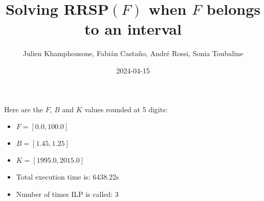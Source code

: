 \documentclass{article}
\begin{document}
     \title{Solving RRSP$(F)$ when $F$ belongs to an interval}
     \author{Julien Khamphousone, Fabi\'an Casta\~no, Andr\'e Rossi, Sonia Toubaline}
     \date{2024-04-15}
     \maketitle
     \def\F{{0.0,1.0,1.1}}
\def\gF{{19.95,21.4,2016.25}}

    Here are the $F$, $B$ and $K$ values rounded at 5 digits:

\begin{itemize}
	\item  $F = [0.0,100.0]$
 \item $B = [1.45,1.25]$
 \item  $K = [1995.0,2015.0]$\item Total execution time is: 6438.22s\item Number of times ILP is called: 3\end{itemize}
\end{document}

